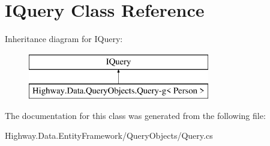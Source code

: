 \hypertarget{class_i_query-g}{\section{I\-Query Class Reference}
\label{class_i_query-g}
}
Inheritance diagram for I\-Query\-:\begin{figure}[H]
\begin{center}
\leavevmode
\includegraphics[height=2.000000cm]{class_i_query-g}
\end{center}
\end{figure}


The documentation for this class was generated from the following file\-:\begin{DoxyCompactItemize}
\item 
Highway.\-Data.\-Entity\-Framework/\-Query\-Objects/Query.\-cs\end{DoxyCompactItemize}
